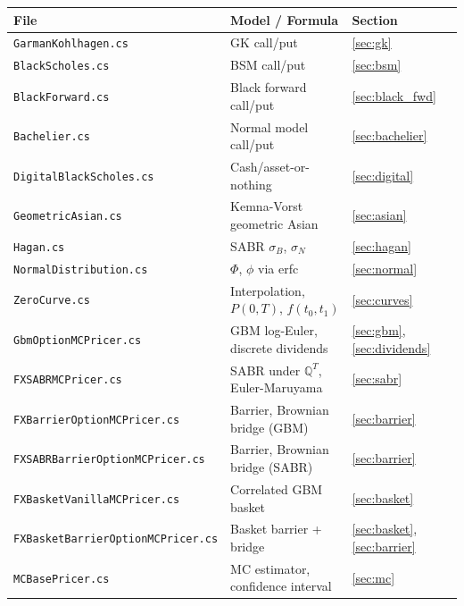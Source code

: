 \documentclass[11pt,a4paper]{article}
\newcommand{\QT}{\mathbb{Q}^T}
\theoremstyle{definition}
\begin{document}
\begin{center}
\renewcommand{\arraystretch}{1.25}
\begin{tabular}{lll}\toprule
\textbf{File} & \textbf{Model / Formula} & \textbf{Section}\\\midrule
\texttt{GarmanKohlhagen.cs}           & GK call/put                       & \ref{sec:gk}\\
\texttt{BlackScholes.cs}              & BSM call/put                      & \ref{sec:bsm}\\
\texttt{BlackForward.cs}              & Black forward call/put            & \ref{sec:black_fwd}\\
\texttt{Bachelier.cs}                 & Normal model call/put             & \ref{sec:bachelier}\\
\texttt{DigitalBlackScholes.cs}       & Cash/asset-or-nothing             & \ref{sec:digital}\\
\texttt{GeometricAsian.cs}            & Kemna-Vorst geometric Asian       & \ref{sec:asian}\\
\texttt{Hagan.cs}                     & SABR $\sigma_B$, $\sigma_N$       & \ref{sec:hagan}\\
\texttt{NormalDistribution.cs}        & $\Phi$, $\phi$ via erfc           & \ref{sec:normal}\\
\texttt{ZeroCurve.cs}                 & Interpolation, $P(0,T)$, $f(t_0,t_1)$ & \ref{sec:curves}\\
\texttt{GbmOptionMCPricer.cs}         & GBM log-Euler, discrete dividends & \ref{sec:gbm},\ref{sec:dividends}\\
\texttt{FXSABRMCPricer.cs}            & SABR under $\QT$, Euler-Maruyama  & \ref{sec:sabr}\\
\texttt{FXBarrierOptionMCPricer.cs}   & Barrier, Brownian bridge (GBM)    & \ref{sec:barrier}\\
\texttt{FXSABRBarrierOptionMCPricer.cs}&Barrier, Brownian bridge (SABR)   & \ref{sec:barrier}\\
\texttt{FXBasketVanillaMCPricer.cs}   & Correlated GBM basket             & \ref{sec:basket}\\
\texttt{FXBasketBarrierOptionMCPricer.cs}&Basket barrier + bridge         & \ref{sec:basket},\ref{sec:barrier}\\
\texttt{MCBasePricer.cs}              & MC estimator, confidence interval & \ref{sec:mc}\\\bottomrule
\end{tabular}
\end{center}
\end{document}

